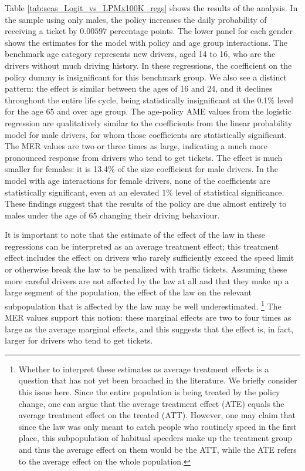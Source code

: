 Table \ref{tab:seas_Logit_vs_LPMx100K_regs} shows the results of the analysis.
In the sample using only males, 
the policy increases the daily probability of receiving a ticket by $0.00597$ 
percentage points. 
The lower panel for each gender shows the estimates for the model with 
policy and age group interactions.  
The benchmark age category represents new drivers, 
aged 14 to 16, who are the drivers without much driving history.
In these regressions,   
the coefficient on the policy dummy is insignificant for this benchmark group. 
We also see a distinct pattern: 
the effect is similar between the ages of 16 and 24, 
and it declines throughout the entire life cycle, being statistically insignificant at the 0.1\% level for the age 65 and over age group.
% 
The age-policy AME values from the logistic regression 
are qualitatively similar to the coefficients from the linear probability model for male drivers, 
for whom those coefficients are statistically significant. 
The MER values are two or three times as large, 
indicating a much more pronounced response from drivers who tend to get tickets. 
% 
The effect is much smaller for females: it is 13.4\% of the size coefficient for male drivers. 
In the model with age interactions for female drivers, 
none of the coefficients are statistically significant,  
even at an elevated 1\% level of statistical significance. 
These findings suggest that the results of the policy are due almost entirely to males under the age of 65 changing their driving behaviour.
%


It is important to note that the estimate of the effect of the law in these regressions 
can be interpreted as an average treatment effect; 
this treatment effect includes the effect on drivers 
who rarely sufficiently exceed the speed limit 
or otherwise break the law to be penalized with traffic tickets. 
Assuming these more careful drivers are not affected by the law at all 
and that they make up a large segment of the population, 
the effect of the law on the relevant subpopulation that is affected by the law 
may be well underestimated.%
\footnote{%
Whether to interpret these estimates as average treatment effects 
is a question that has not yet been broached in the literature. 
We briefly consider this issue here. 
Since the entire population is being treated by the policy change, 
one can argue that the average treatment effect (ATE) equals 
the average treatment effect on the treated (ATT). 
However, one may claim that since the law was only meant to catch people 
who routinely speed in the first place, 
this subpopulation of habitual speeders make up the treatment group 
and thus the average effect on them would be the ATT, 
while the ATE refers to the average effect on the whole population.
}
%
The MER values support this notion: 
these marginal effects are two to four times as large as the average marginal effects, 
and this suggests that the effect is, in fact, larger for drivers who tend to get tickets.

